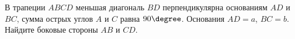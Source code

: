 \begin{ex}
	\begin{condition}
		В трапеции \( ABCD  \) меньшая диагональ \( BD  \) перпендикулярна основаниям \( AD  \) и \( BC \), сумма острых углов \( A  \) и \( C \) равна \( 90\degree \). Основания \( AD = a \), \( BC = b \). Найдите боковые стороны \( AB  \) и \( CD \).
	\end{condition}
\end{ex}